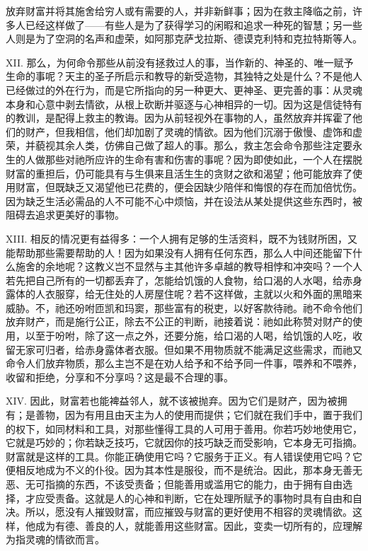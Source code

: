 放弃财富并将其施舍给穷人或有需要的人，并非新鲜事；因为在救主降临之前，许多人已经这样做了——有些人是为了获得学习的闲暇和追求一种死的智慧；另一些人则是为了空洞的名声和虚荣，如阿那克萨戈拉斯、德谟克利特和克拉特斯等人。\par

XII. 那么，为何命令那些从前没有拯救过人的事，当作新的、神圣的、唯一赋予生命的事呢？天主的圣子所启示和教导的新受造物，其独特之处是什么？不是他人已经做过的外在行为，而是它所指向的另一种更大、更神圣、更完善的事：从灵魂本身和心意中剥去情欲，从根上砍断并驱逐与心神相异的一切。因为这是信徒特有的教训，是配得上救主的教诲。因为从前轻视外在事物的人，虽然放弃并挥霍了他们的财产，但我相信，他们却加剧了灵魂的情欲。因为他们沉溺于傲慢、虚饰和虚荣，并藐视其余人类，仿佛自己做了超人的事。那么，救主怎会命令那些注定要永生的人做那些对祂所应许的生命有害和伤害的事呢？因为即使如此，一个人在摆脱财富的重担后，仍可能具有与生俱来且活生生的贪财之欲和渴望；他可能放弃了使用财富，但既缺乏又渴望他已花费的，便会因缺少陪伴和悔恨的存在而加倍忧伤。因为缺乏生活必需品的人不可能不心中烦恼，并在设法从某处提供这些东西时，被阻碍去追求更美好的事物。\par

XIII. 相反的情况更有益得多：一个人拥有足够的生活资料，既不为钱财所困，又能帮助那些需要帮助的人！因为如果没有人拥有任何东西，那么人中间还能留下什么施舍的余地呢？这教义岂不显然与主其他许多卓越的教导相悖和冲突吗？一个人若先把自己所有的一切都丢弃了，怎能给饥饿的人食物，给口渴的人水喝，给赤身露体的人衣服穿，给无住处的人房屋住呢？若不这样做，主就以火和外面的黑暗来威胁。不，祂还吩咐匝凯和玛窦，那些富有的税吏，以好客款待祂。祂不命令他们放弃财产，而是施行公正，除去不公正的判断，祂接着说：祂如此称赞对财产的使用，以至于吩咐，除了这一点之外，还要分施，给口渴的人喝，给饥饿的人吃，收留无家可归者，给赤身露体者衣服。但如果不用物质就不能满足这些需求，而祂又命令人们放弃物质，那么主岂不是在劝人给予和不给予同一件事，喂养和不喂养，收留和拒绝，分享和不分享吗？这是最不合理的事。\par

XIV. 因此，财富若也能裨益邻人，就不该被抛弃。因为它们是财产，因为被拥有；是善物，因为有用且由天主为人的使用而提供；它们就在我们手中，置于我们的权下，如同材料和工具，对那些懂得工具的人可用于善用。你若巧妙地使用它，它就是巧妙的；你若缺乏技巧，它就因你的技巧缺乏而受影响，它本身无可指摘。财富就是这样的工具。你能正确使用它吗？它服务于正义。有人错误使用它吗？它便相反地成为不义的仆役。因为其本性是服役，而不是统治。因此，那本身无善无恶、无可指摘的东西，不该受责备；但能善用或滥用它的能力，由于拥有自由选择，才应受责备。这就是人的心神和判断，它在处理所赋予的事物时具有自由和自决。所以，愿没有人摧毁财富，而应摧毁与财富的更好使用不相容的灵魂情欲。这样，他成为有德、善良的人，就能善用这些财富。因此，变卖一切所有的，应理解为指灵魂的情欲而言。\par

